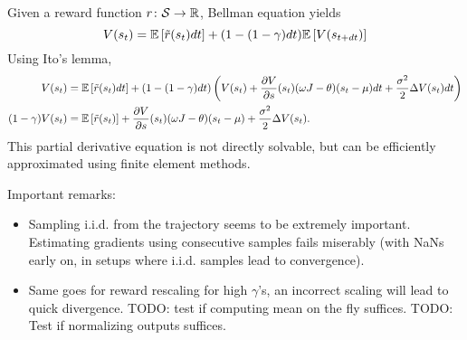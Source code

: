 Given a reward function $r\colon \mathcal{S} \to {\mathbb{R}}$, Bellman equation yields
\begin{equation}
	V(s_{t}) = \mathbb{E}\left[\tilde{r}(s_t)dt\right] + (1 - (1 - \gamma)dt)\mathbb{E}\left[V(s_{t+dt})\right]
\end{equation}
Using Ito's lemma,
\begin{align}
	V(s_{t}) &= \mathbb{E}\left[\tilde{r}(s_t)dt\right] + (1 - (1 - \gamma)dt)\left(V(s_t) + \frac{\partial V}{\partial s}(s_t) (\omega J - \theta) (s_t - \mu) dt + \frac{\sigma^2}{2}\Delta V(s_t) dt\right)\nonumber\\
	(1 - \gamma) V(s_t) &= \mathbb{E}\left[\tilde{r}(s_t)\right] + \frac{\partial V}{\partial s}(s_t) (\omega J - \theta) (s_t - \mu) + \frac{\sigma^2}{2}\Delta V(s_t).
\end{align}
This partial derivative equation is not directly solvable, but can be efficiently approximated
using finite element methods.

Important remarks:
\begin{itemize}
	\item Sampling i.i.d. from the trajectory seems to be extremely
		important. Estimating gradients using consecutive samples fails
		miserably (with NaNs early on, in setups where i.i.d. samples
		lead to convergence).
	\item Same goes for reward rescaling for high $\gamma$'s, an incorrect scaling
		will lead to quick divergence. TODO: test if computing mean on the fly
		suffices. TODO: Test if normalizing outputs suffices.
\end{itemize}

